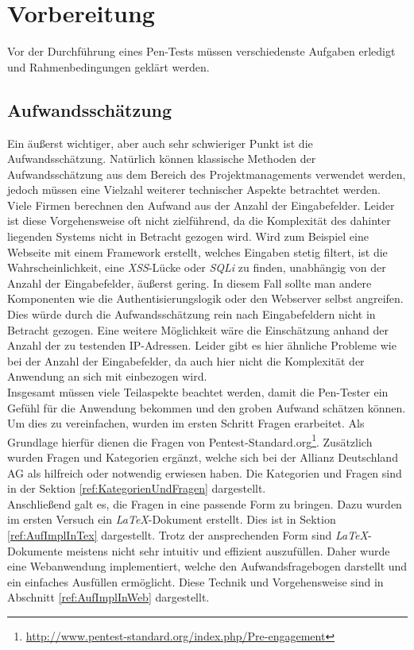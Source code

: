 \section{Vorbereitung}
Vor der Durchführung eines Pen-Tests müssen verschiedenste Aufgaben erledigt und Rahmenbedingungen geklärt werden.

\subsection{Aufwandsschätzung}
	Ein äußerst wichtiger, aber auch sehr schwieriger Punkt ist die Aufwandsschätzung. Natürlich können klassische Methoden der Aufwandsschätzung aus dem Bereich des Projektmanagements verwendet werden, jedoch müssen eine Vielzahl weiterer technischer Aspekte betrachtet werden.\\
	
	Viele Firmen berechnen den Aufwand aus der Anzahl der Eingabefelder. Leider ist diese Vorgehensweise oft nicht zielführend, da die Komplexität des dahinter liegenden Systems nicht in Betracht gezogen wird. Wird zum Beispiel eine Webseite mit einem Framework erstellt, welches Eingaben stetig filtert, ist die Wahrscheinlichkeit, eine \textit{XSS}-Lücke oder \textit{SQLi} zu finden, unabhängig von der Anzahl der Eingabefelder, äußerst gering. In diesem Fall sollte man andere Komponenten wie die Authentisierungslogik oder den Webserver selbst angreifen. Dies würde durch die Aufwandsschätzung rein nach Eingabefeldern nicht in Betracht gezogen. Eine weitere Möglichkeit wäre die Einschätzung anhand der Anzahl der zu testenden IP-Adressen. Leider gibt es hier ähnliche Probleme wie bei der Anzahl der Eingabefelder, da auch hier nicht die Komplexität der Anwendung an sich mit einbezogen wird.\\

Insgesamt müssen viele Teilaspekte beachtet werden, damit die Pen-Tester ein Gefühl für die Anwendung bekommen und den groben Aufwand schätzen können. Um dies zu vereinfachen, wurden im ersten Schritt Fragen erarbeitet. Als Grundlage hierfür dienen die Fragen von Pentest-Standard.org\footnote{\url{http://www.pentest-standard.org/index.php/Pre-engagement}}. Zusätzlich wurden Fragen und Kategorien ergänzt, welche sich bei der Allianz Deutschland AG als hilfreich oder notwendig erwiesen haben. Die Kategorien und Fragen sind in der Sektion \ref{ref:KategorienUndFragen} dargestellt.\\

\newpage
Anschließend galt es, die Fragen in eine passende Form zu bringen. Dazu wurden im ersten Versuch ein \textit{LaTeX}-Dokument erstellt. Dies ist in Sektion \ref{ref:AufImplInTex} dargestellt. Trotz der ansprechenden Form sind \textit{LaTeX}-Dokumente meistens nicht sehr intuitiv und effizient auszufüllen. Daher wurde eine Webanwendung implementiert, welche den Aufwandsfragebogen darstellt und ein einfaches Ausfüllen ermöglicht. Diese Technik und Vorgehensweise sind in Abschnitt \ref{ref:AufImplInWeb} dargestellt.\\ 

